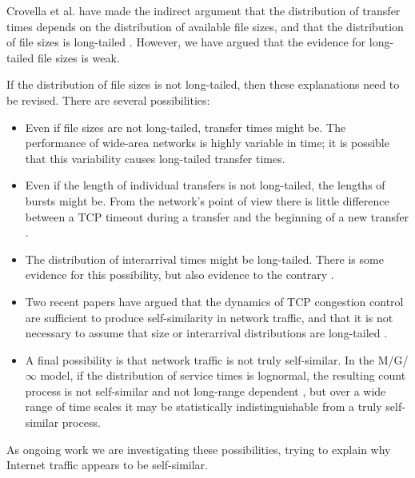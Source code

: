 \documentclass[10pt,twocolumn]{article}
\begin{document}
Crovella et al. have made the indirect argument that the
distribution of transfer times depends on the distribution of
available file sizes, and that the distribution of file sizes is
long-tailed \cite{CrovellaTaqquBestavros99}.  However, we have argued
that the evidence for long-tailed file sizes is weak.

If the distribution of file sizes is not long-tailed, then these
explanations need to be revised.  There are several possibilities:

\begin{itemize} 

\item Even if file sizes are not long-tailed, transfer times might
be.  The performance of wide-area networks is highly variable in time; it
is possible that this variability causes long-tailed transfer times.

\item Even if the length of individual transfers is not long-tailed, the
lengths of bursts might be.  From the network's point of view there is
little difference between a TCP timeout during a transfer and the
beginning of a new transfer \cite{PaxsonFloyd95}.

\item The distribution of interarrival times might be long-tailed.
There is some evidence for this possibility,
but also evidence to the contrary \cite{PaxsonFloyd95}
\cite{ArlittWilliamson96} \cite{BarfordCrovella98}
\cite{FeldmannGilbertWillingerKurtz98}.

\item Two recent papers have argued that the dynamics of TCP
congestion control are sufficient to produce self-similarity in
network traffic, and that it is not necessary to assume
that size or interarrival distributions are long-tailed
\cite{VeresBoda00} \cite{FengTinnakornsrisuphap00}.

\item A final possibility is that network traffic is not truly
self-similar.  In the M/G/$\infty$ model,
if the distribution of service times is lognormal, the resulting count
process is not self-similar and not long-range dependent
\cite{PaxsonFloyd95}, but over a wide range of time
scales it may be statistically indistinguishable from a
truly self-similar process.

\end{itemize}

As ongoing work we are investigating these possibilities, trying to
explain why Internet traffic appears to be self-similar.
\end{document}
